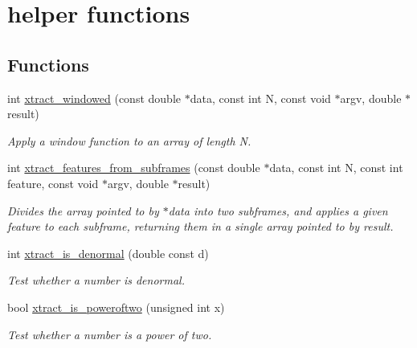\hypertarget{group__helper}{\section{helper functions}
\label{group__helper}
}
\subsection*{Functions}
\begin{DoxyCompactItemize}
\item 
int \hyperlink{group__helper_ga1da0b9d609d75509fd6941836182a500}{xtract\-\_\-windowed} (const double $\ast$data, const int N, const void $\ast$argv, double $\ast$result)
\begin{DoxyCompactList}\small\item\em Apply a window function to an array of length N. \end{DoxyCompactList}\item 
int \hyperlink{group__helper_gabc1088a908047f41202d4f4c85d560ea}{xtract\-\_\-features\-\_\-from\-\_\-subframes} (const double $\ast$data, const int N, const int feature, const void $\ast$argv, double $\ast$result)
\begin{DoxyCompactList}\small\item\em Divides the array pointed to by $\ast$data into two subframes, and applies a given feature to each subframe, returning them in a single array pointed to by result. \end{DoxyCompactList}\item 
\hypertarget{group__helper_gad2313ad037083ea941434c479dbb8513}{int \hyperlink{group__helper_gad2313ad037083ea941434c479dbb8513}{xtract\-\_\-is\-\_\-denormal} (double const d)}\label{group__helper_gad2313ad037083ea941434c479dbb8513}

\begin{DoxyCompactList}\small\item\em Test whether a number is denormal. \end{DoxyCompactList}\item 
\hypertarget{group__helper_ga603e98918bf68b4f71aea41a2c3ac7ac}{bool \hyperlink{group__helper_ga603e98918bf68b4f71aea41a2c3ac7ac}{xtract\-\_\-is\-\_\-poweroftwo} (unsigned int x)}\label{group__helper_ga603e98918bf68b4f71aea41a2c3ac7ac}

\begin{DoxyCompactList}\small\item\em Test whether a number is a power of two. \end{DoxyCompactList}\end{DoxyCompactItemize}


